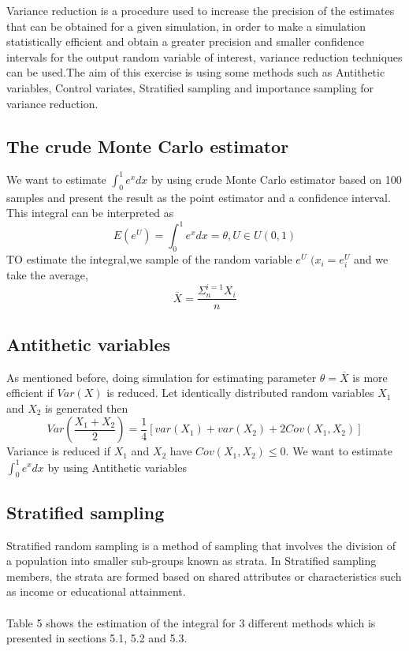 Variance reduction is a procedure used to increase the precision of the estimates that can be obtained for a given simulation, in order to make a simulation statistically efficient and obtain a greater precision and smaller confidence intervals for the output random variable of interest, variance reduction techniques can be used.The aim of this exercise is using some methods such as Antithetic variables, Control variates, Stratified sampling and importance sampling for variance reduction.
\subsection{The crude Monte Carlo estimator}
We want to estimate $\int_0^1 e^{x}dx$ by using crude Monte Carlo estimator based on 100 samples and present the result as the point estimator and a confidence interval.\\
This integral can be interpreted as
\begin{equation}
    E(e^U)=\int_0^1 e^{x}dx=\theta,        U\in U(0,1)
\end{equation}
TO estimate the integral,we sample of the random variable $e^U$ $(x_{i}=e^U_{i}$ and we take the average,\\
\begin{equation}
    \overline{X}=\frac{\Sigma^{i=1}_{n}X_i}{n}
\end{equation}
\subsection{Antithetic variables}
As mentioned before, doing simulation for estimating parameter $\theta=\overline{X}$ is more efficient if $Var(X)$ is reduced. Let identically distributed random variables $X_1$ and $X_2$ is generated then
\begin{equation}
    Var(\frac{X_1+X_2}{2})=\frac{1}{4}[var(X_1)+var(X_2)+2 Cov(X_1,X_2)]
\end{equation}
Variance is reduced if  $X_1$ and $X_2$ have $Cov(X_1,X_2)\leq 0$.
We want to estimate $\int_0^1 e^{x}dx$ by using Antithetic variables
\subsection{Stratified sampling}
Stratified random sampling is a method of sampling that involves the division of a population into smaller sub-groups known as strata. In  Stratified sampling members, the strata are formed based on shared attributes or characteristics such as income or educational attainment.\\
\\Table 5 shows the estimation of the integral for 3 different methods which is presented in sections 5.1, 5.2 and 5.3.

